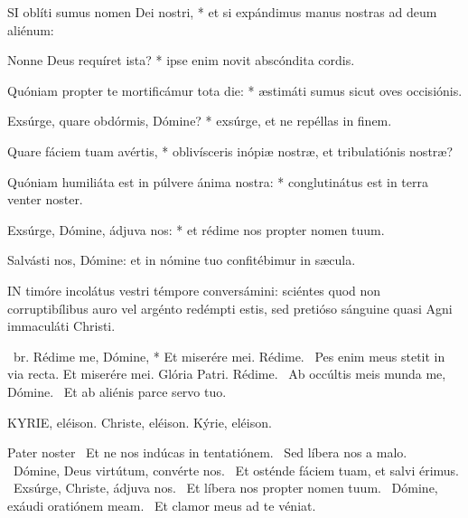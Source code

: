 
\lettrine[lines=2]{S}{I} oblíti sumus nomen Dei nostri, * et si expándimus manus nostras ad deum aliénum:

Nonne Deus requíret ista? * ipse enim novit abscóndita cordis.

Quóniam propter te mortificámur tota die: * æstimáti sumus sicut oves occisiónis.

Exsúrge, quare obdórmis, Dómine? * exsúrge, et ne repéllas in finem.

Quare fáciem tuam avértis, * oblivísceris inópiæ nostræ, et tribulatiónis nostræ?

Quóniam humiliáta est in púlvere ánima nostra: * conglutinátus est in terra venter noster.

Exsúrge, Dómine, ádjuva nos: * et rédime nos propter nomen tuum.

 Salvásti nos, Dómine: et in nómine tuo confitébimur in sæcula.



\lettrine[lines=2]{I}{N} timóre incolátus vestri témpore conversámini: sciéntes quod non corruptibílibus auro vel argénto redémpti estis, sed pretióso sánguine quasi Agni immaculáti Christi.

\R\ br. Rédime me, Dómine, * Et miserére mei. Rédime. \V\ Pes enim meus stetit in via recta. Et miserére mei. Glória Patri. Rédime. \V\ Ab occúltis meis munda me, Dómine. \R\ Et ab aliénis parce servo tuo.



KYRIE, eléison. Christe, eléison. Kýrie, eléison.

Pater noster  \V\ Et ne nos indúcas in tentatiónem. \R\ Sed líbera nos a malo. \V\ Dómine, Deus virtútum, convérte nos. \R\ Et osténde fáciem tuam, et salvi érimus. \V\ Exsúrge, Christe, ádjuva nos. \R\ Et líbera nos propter nomen tuum. \V\ Dómine, exáudi oratiónem meam. \R\ Et clamor meus ad te véniat.



